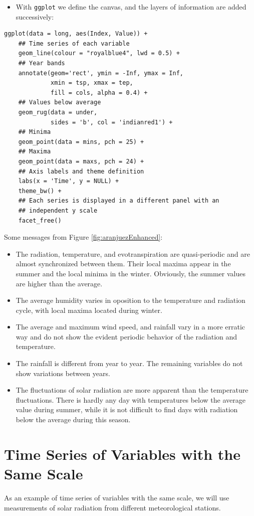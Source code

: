 \begin{itemize}
\item With \texttt{ggplot} we define the canvas, and the layers of information are
added successively:
\end{itemize}
\lstset{language=r,label= ,caption= ,captionpos=b,numbers=none}
\begin{lstlisting}
ggplot(data = long, aes(Index, Value)) +
    ## Time series of each variable
    geom_line(colour = "royalblue4", lwd = 0.5) +
    ## Year bands
    annotate(geom='rect', ymin = -Inf, ymax = Inf,
             xmin = tsp, xmax = tep,
             fill = cols, alpha = 0.4) +
    ## Values below average
    geom_rug(data = under,
             sides = 'b', col = 'indianred1') +
    ## Minima
    geom_point(data = mins, pch = 25) +
    ## Maxima
    geom_point(data = maxs, pch = 24) +
    ## Axis labels and theme definition
    labs(x = 'Time', y = NULL) +
    theme_bw() +
    ## Each series is displayed in a different panel with an
    ## independent y scale
    facet_free()
\end{lstlisting}

Some messages from Figure \ref{fig:aranjuezEnhanced}:
\begin{itemize}
\item The radiation, temperature, and evotranspiration are
quasi-periodic and are almost synchronized between them. Their
local maxima appear in the summer and the local minima in the
winter. Obviously, the summer values are higher than the
average.
\item The average humidity varies in oposition to the temperature and
radiation cycle, with local maxima located during winter.
\item The average and maximum wind speed, and rainfall vary in a more
erratic way and do not show the evident periodic behavior of
the radiation and temperature.
\item The rainfall is different from year to year. The remaining variables
do not show variations between years.
\item The fluctuations of solar radiation are more apparent than
the temperature fluctuations. There is hardly any day with
temperatures below the average value during summer, while it is
not difficult to find days with radiation below the average
during this season.
\end{itemize}

\section{Time Series of Variables with the Same Scale \label{SEC:sameScale}}
\label{sec:orgd1d94c9}
As an example of time series of variables with the same scale, we will
use measurements of solar radiation from different meteorological
stations.

